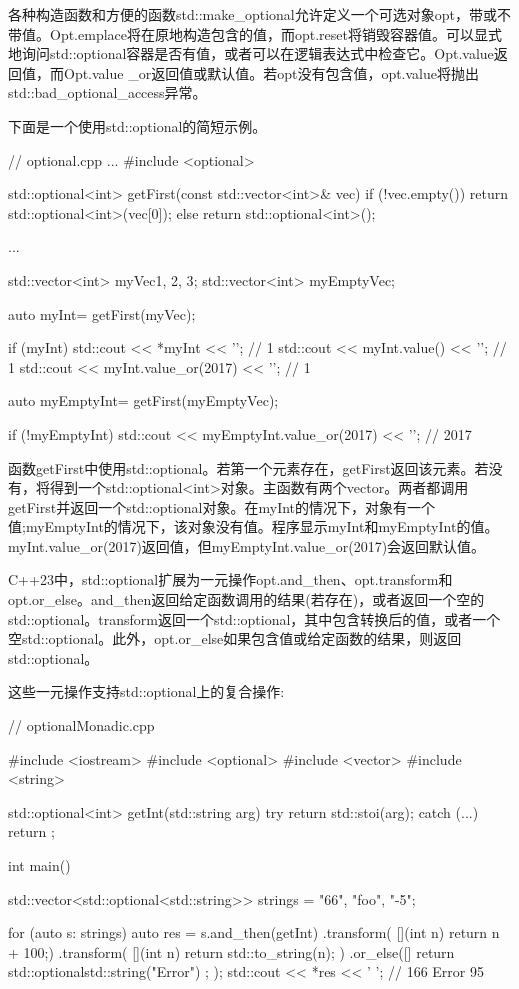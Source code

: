 各种构造函数和方便的函数std::make\_optional允许定义一个可选对象opt，带或不带值。Opt.emplace将在原地构造包含的值，而opt.reset将销毁容器值。可以显式地询问std::optional容器是否有值，或者可以在逻辑表达式中检查它。Opt.value返回值，而Opt.value \_or返回值或默认值。若opt没有包含值，opt.value将抛出std::bad\_optional\_access异常。

下面是一个使用std::optional的简短示例。


\begin{cpp}
// optional.cpp
...
#include <optional>

std::optional<int> getFirst(const std::vector<int>& vec){
	if (!vec.empty()) return std::optional<int>(vec[0]);
	else return std::optional<int>();
}

...

std::vector<int> myVec{1, 2, 3};
std::vector<int> myEmptyVec;

auto myInt= getFirst(myVec);

if (myInt){
	std::cout << *myInt << '\n'; // 1
	std::cout << myInt.value() << '\n'; // 1
	std::cout << myInt.value_or(2017) << '\n'; // 1
}

auto myEmptyInt= getFirst(myEmptyVec);

if (!myEmptyInt){
	std::cout << myEmptyInt.value_or(2017) << '\n'; // 2017
}
\end{cpp}

函数getFirst中使用std::optional。若第一个元素存在，getFirst返回该元素。若没有，将得到一个std::optional<int>对象。主函数有两个vector。两者都调用getFirst并返回一个std::optional对象。在myInt的情况下，对象有一个值;myEmptyInt的情况下，该对象没有值。程序显示myInt和myEmptyInt的值。myInt.value\_or(2017)返回值，但myEmptyInt.value\_or(2017)会返回默认值。

C++23中，std::optional扩展为一元操作opt.and\_then、opt.transform和opt.or\_else。and\_then返回给定函数调用的结果(若存在)，或者返回一个空的std::optional。transform返回一个std::optional，其中包含转换后的值，或者一个空std::optional。此外，opt.or\_else如果包含值或给定函数的结果，则返回std::optional。

这些一元操作支持std::optional上的复合操作:


\begin{cpp}
// optionalMonadic.cpp

#include <iostream>
#include <optional>
#include <vector>
#include <string>

std::optional<int> getInt(std::string arg) {
	try {
		return {std::stoi(arg)};
	}
	catch (...) {
		return { };
	}
}


int main() {

	std::vector<std::optional<std::string>> strings = {"66", "foo", "-5"};
	
	for (auto s: strings) {
		auto res = s.and_then(getInt)
					.transform( [](int n) { return n + 100;})
					.transform( [](int n) { return std::to_string(n); })
					.or_else([] { return std::optional{std::string("Error") }; });
		std::cout << *res << ' '; // 166 Error 95
	}

}
\end{cpp}

